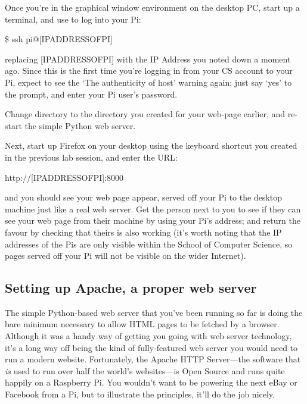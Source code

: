 Once you're in the graphical window environment on the desktop PC, start up a terminal, and use  to log into your Pi:

\begin{ttoutenv}
\$ ssh pi@[IPADDRESSOFPI]
\end{ttoutenv}

replacing [IPADDRESSOFPI] with the IP Address you noted down a moment ago. Since this is the first time you're logging in from your CS account to your Pi, expect to see the `The authenticity of host' warning again; just say `yes' to the prompt, and enter your Pi user's password.

Change directory to the  directory you created for your web-page earlier, and re-start the simple Python web server.

Next, start up Firefox on your desktop using the keyboard shortcut you created in the previous lab session, and enter the URL:

\begin{ttoutenv}
http://[IPADDRESSOFPI]:8000
\end{ttoutenv}

and you should see your web page appear, served off your Pi to the desktop machine just like a real web server. Get the person next to you to see if they can see your web page from their machine by using your Pi's address; and return the favour by checking that theirs is also working (it's worth noting that the IP addresses of the Pis are only visible within the School of Computer Science, so pages served off your Pi will not be visible on the wider Internet).


\subsection{Setting up Apache, a proper web server}

The simple Python-based web server that you've been running so far is doing the bare minimum necessary to allow HTML pages to be fetched by a browser. Although it was a handy way of getting you going with web server technology, it's a long way off being the kind of fully-featured web server you would need to run a modern website. Fortunately, the Apache HTTP Server---the software that \textit{is} used to run over half the world's websites---is Open Source and runs quite happily on a Raspberry Pi. You wouldn't want to be powering the next eBay or Facebook from a Pi, but to illustrate the principles, it'll do the job nicely.

